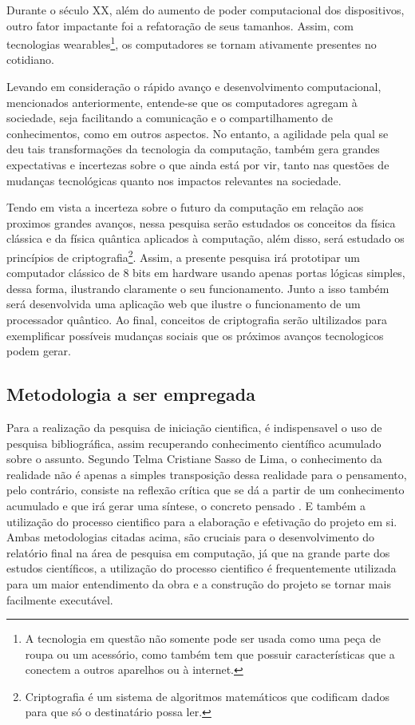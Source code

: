 Durante o século XX, além do aumento de poder computacional dos dispositivos, outro fator impactante foi a refatoração de seus tamanhos. Assim, com tecnologias wearables\footnote{A tecnologia em questão não somente pode ser usada como uma peça de roupa ou um acessório, como também tem que possuir características que a conectem a outros aparelhos ou à internet.}, os computadores se tornam ativamente presentes no cotidiano.

Levando em consideração o rápido avanço e desenvolvimento computacional, mencionados anteriormente, entende-se que os computadores agregam à sociedade, seja facilitando a comunicação e o compartilhamento de conhecimentos, como em outros aspectos. No entanto, a agilidade pela qual se deu tais transformações da tecnologia da computação, também gera grandes expectativas e incertezas sobre o que ainda está por vir, tanto nas questões de mudanças tecnológicas quanto nos impactos relevantes na sociedade.

Tendo em vista a incerteza sobre o futuro da computação em relação aos proximos grandes avanços, nessa pesquisa serão estudados os conceitos da física clássica e da física quântica aplicados à computação, além disso, será estudado os princípios de criptografia\footnote{Criptografia é um sistema de algoritmos matemáticos que codificam dados para que só o destinatário possa ler.}. Assim, a presente pesquisa irá prototipar um computador clássico de 8 bits em hardware usando apenas portas lógicas simples, dessa forma, ilustrando claramente o seu funcionamento. Junto a isso também será desenvolvida uma aplicação web que ilustre o funcionamento de um processador quântico. Ao final, conceitos de criptografia serão ultilizados para exemplificar possíveis mudanças sociais que os próximos avanços tecnologicos podem gerar.

\subsection{Metodologia a ser empregada}
Para a realização da pesquisa de iniciação cientifica, é indispensavel o uso de pesquisa bibliográfica, assim recuperando conhecimento científico acumulado sobre o assunto. Segundo Telma Cristiane Sasso de Lima, o conhecimento da realidade não é apenas a simples transposição dessa realidade para o pensamento, pelo contrário, consiste na reflexão crítica que se dá a partir de um conhecimento acumulado e que irá gerar uma síntese, o concreto pensado \cite{1}. E também a utilização do processo cientifico para a elaboração e efetivação do projeto em si. Ambas metodologias citadas acima, são cruciais para o desenvolvimento do relatório final na área de pesquisa em computação, já que na grande parte dos estudos científicos, a utilização do processo cientifico é frequentemente utilizada para um maior entendimento da obra e a construção do projeto se tornar mais facilmente executável.

